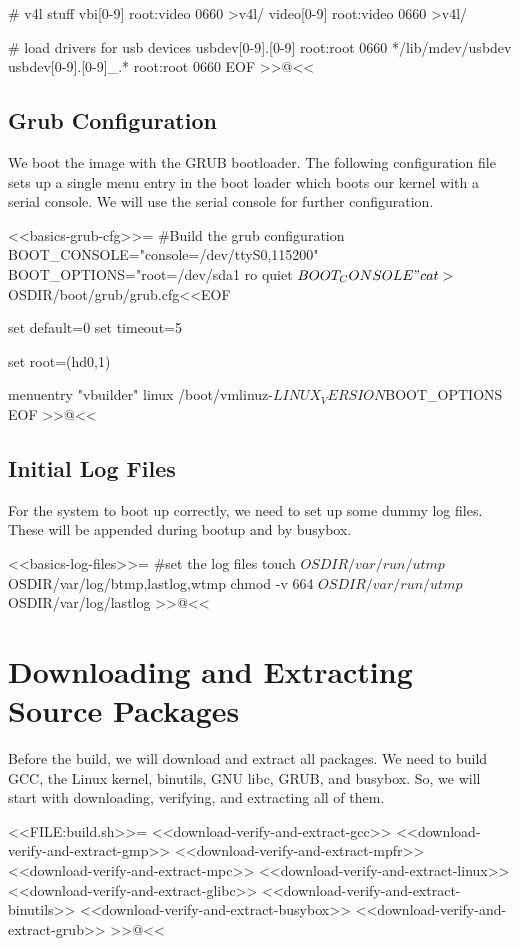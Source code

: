 # v4l stuff
vbi[0-9]        root:video 0660 >v4l/
video[0-9]      root:video 0660 >v4l/

# load drivers for usb devices
usbdev[0-9].[0-9]       root:root 0660 */lib/mdev/usbdev
usbdev[0-9].[0-9]_.*    root:root 0660
EOF
>>@<<

\subsection{Grub Configuration}

We boot the image with the GRUB bootloader. The following configuration file
sets up a single menu entry in the boot loader which boots our kernel with a
serial console.  We will use the serial console for further configuration.

<<basics-grub-cfg>>=
#Build the grub configuration
BOOT_CONSOLE="console=/dev/ttyS0,115200"
BOOT_OPTIONS="root=/dev/sda1 ro quiet $BOOT_CONSOLE"
cat > ${OSDIR}/boot/grub/grub.cfg<<EOF

set default=0
set timeout=5

set root=(hd0,1)

menuentry "vbuilder" {
        linux   /boot/vmlinuz-${LINUX_VERSION} ${BOOT_OPTIONS}
}
EOF
>>@<<

\subsection{Initial Log Files}

For the system to boot up correctly, we need to set up some dummy log files.
These will be appended during bootup and by busybox.

<<basics-log-files>>=
#set the log files
touch ${OSDIR}/var/run/utmp ${OSDIR}/var/log/{btmp,lastlog,wtmp}
chmod -v 664 ${OSDIR}/var/run/utmp ${OSDIR}/var/log/lastlog
>>@<<

\section{Downloading and Extracting Source Packages}

Before the build, we will download and extract all packages.  We need to build
GCC, the Linux kernel, binutils, GNU libc, GRUB, and busybox.  So, we will start
with downloading, verifying, and extracting all of them.

<<FILE:build.sh>>=
    <<download-verify-and-extract-gcc>>
    <<download-verify-and-extract-gmp>>
    <<download-verify-and-extract-mpfr>>
    <<download-verify-and-extract-mpc>>
    <<download-verify-and-extract-linux>>
    <<download-verify-and-extract-glibc>>
    <<download-verify-and-extract-binutils>>
    <<download-verify-and-extract-busybox>>
    <<download-verify-and-extract-grub>>
>>@<<

